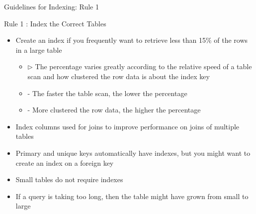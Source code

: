 \documentclass[aspectratio=169, xcolor=dvipsnames]{beamer}
\begin{document}
\begin{frame}{Guidelines for Indexing: Rule 1}
    \begin{alertblock}{Rule 1 : Index the Correct Tables}
        \begin{itemize}[<+->]
            \item Create an index if you frequently want to retrieve less than 15\% of the rows in a large table
            \begin{itemize}[<+->]
                \item $\triangleright$ The percentage varies greatly according to the relative speed of a table scan and how clustered the row data is about the index key
                \item - The faster the table scan, the lower the percentage
                \item - More clustered the row data, the higher the percentage
            \end{itemize}
            \item Index columns used for joins to improve performance on joins of multiple tables
            \item Primary and unique keys automatically have indexes, but you might want to create an index on a foreign key
            \item Small tables do not require indexes
            \item If a query is taking too long, then the table might have grown from small to large
        \end{itemize}
    \end{alertblock}
\end{frame}
\end{document}
